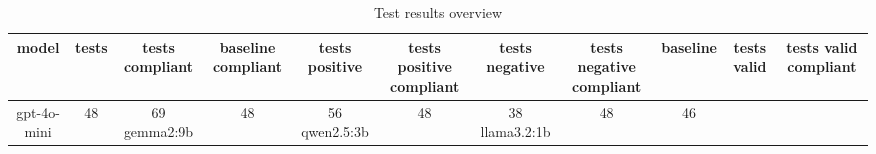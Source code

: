 
  \begin{table}[h!]
  \centering
  \begin{tabular}{|c|c|c|c|c|c|c|c|c|c|c|}
  \hline
  model & tests & tests compliant & baseline compliant & tests positive & tests positive compliant & tests negative & tests negative compliant & baseline & tests valid & tests valid compliant \\
  \hline
  gpt-4o-mini & 48 & 69%
\hline
gemma2:9b & 48 & 56%
\hline
qwen2.5:3b & 48 & 38%
\hline
llama3.2:1b & 48 & 46%
  \end{tabular}
  \caption{Test results overview}
  
  \end{table}
  